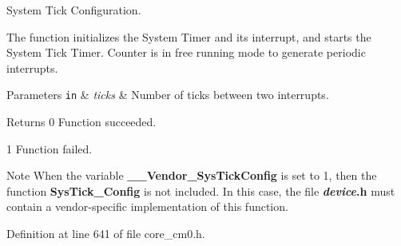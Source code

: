 System Tick Configuration. 

The function initializes the System Timer and its interrupt, and starts the System Tick Timer. Counter is in free running mode to generate periodic interrupts.


\begin{DoxyParams}[1]{Parameters}
\mbox{\tt in}  & {\em ticks} & Number of ticks between two interrupts.\\
\hline
\end{DoxyParams}
\begin{DoxyReturn}{Returns}
0 Function succeeded. 

1 Function failed.
\end{DoxyReturn}
\begin{DoxyNote}{Note}
When the variable {\bfseries \-\_\-\-\_\-\-Vendor\-\_\-\-Sys\-Tick\-Config} is set to 1, then the function {\bfseries Sys\-Tick\-\_\-\-Config} is not included. In this case, the file {\bfseries {\itshape device}.h} must contain a vendor-\/specific implementation of this function. 
\end{DoxyNote}


Definition at line 641 of file core\-\_\-cm0.\-h.

